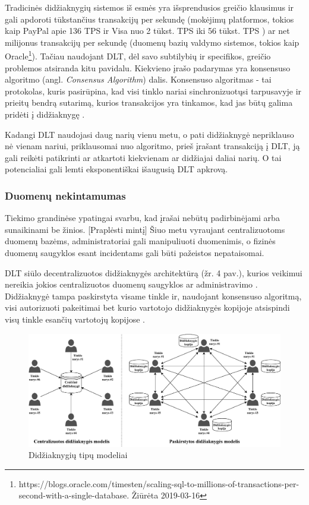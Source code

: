 Tradicinės didžiaknygių sistemos iš esmės yra išsprendusios greičio klausimus ir gali apdoroti tūkstančius transakcijų per sekundę (mokėjimų platformos, tokios kaip PayPal apie 136 TPS ir Visa nuo 2 tūkst. TPS iki 56 tūkst. TPS \cite{herrera2016privacy}) ar net milijonus transakcijų per sekundę (duomenų bazių valdymo sistemos, tokios kaip Oracle\footnote{https://blogs.oracle.com/timesten/scaling-sql-to-millions-of-transactions-per-second-with-a-single-database. Žiūrėta 2019-03-16}). Tačiau naudojant DLT, dėl savo subtilybių ir specifikos, greičio problemos atsiranda kitu pavidalu. Kiekvieno įrašo padarymas yra konsensuso algoritmo (angl. \textit{Consensus Algorithm}) dalis. Konsensuso algoritmas - tai protokolas, kuris pasirūpina, kad visi tinklo nariai sinchronizuotųsi tarpusavyje ir prieitų bendrą sutarimą, kurios transakcijos yra tinkamos, kad jas būtų galima pridėti į didžiaknygę \cite{cachin2017blockchain}. 

Kadangi DLT naudojasi daug narių vienu metu, o pati didžiaknygė nepriklauso nė vienam nariui, priklausomai nuo algoritmo, prieš įrašant transakciją į DLT, ją gali reikėti patikrinti ar atkartoti kiekvienam ar didžiajai daliai narių. O tai potencialiai gali lemti eksponentiškai išaugusią DLT apkrovą. 

\subsubsection{Duomenų nekintamumas}

Tiekimo grandinėse ypatingai svarbu, kad įrašai nebūtų padirbinėjami arba sunaikinami be žinios. [Praplėsti mintį] Šiuo metu vyraujant centralizuotoms duomenų bazėms, administratoriai gali manipuliuoti duomenimis, o fizinės duomenų saugyklos esant incidentams gali būti pažeistos nepataisomai.

DLT siūlo decentralizuotos didžiaknygės architektūrą (žr. 4 pav.), kurios veikimui nereikia jokios centralizuotos duomenų saugyklos ar administravimo \cite{yu2018virtualization}. Didžiaknygė tampa paskirstyta visame tinkle ir, naudojant konsensuso algoritmą, visi autorizuoti pakeitimai bet kurio vartotojo didžiaknygės kopijoje atsispindi visų tinkle esančių vartotojų kopijose \cite{puthal2018blockchain}. 

\begin{figure}[H]
    \centering
    \includegraphics[scale=0.65]{images/ledger-model-types}
    \caption{Didžiaknygių tipų modeliai}
\end{figure}

